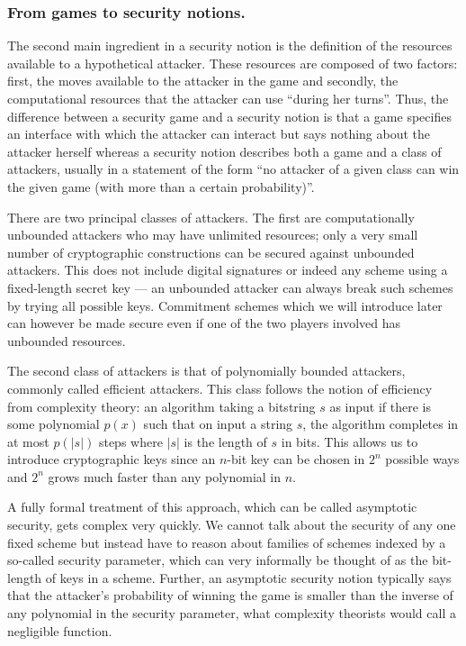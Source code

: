 \documentclass{llncs}
\begin{document}
\subsubsection{From games to security notions.}
The second main ingredient in a security notion is the definition of the
resources available to a hypothetical attacker. These resources are composed of
two factors: first, the moves available to the attacker in the game and
secondly, the computational resources that the attacker can use ``during her
turns''. Thus, the difference between a security game and a security notion is
that a game specifies an interface with which the attacker can interact but says
nothing about the attacker herself whereas a security notion describes both a
game and a class of attackers, usually in a statement of the form ``no attacker
of a given class can win the given game (with more than a certain probability)''.

There are two principal classes of attackers. The first are computationally
unbounded attackers who may have unlimited resources; only a very small number
of cryptographic constructions can be secured against unbounded attackers. This
does not include digital signatures or indeed any scheme using a fixed-length
secret key --- an unbounded attacker can always break such schemes by trying all
possible keys. Commitment schemes which we will introduce later can however be
made secure even if one of the two players involved has unbounded resources.

The second class of attackers is that of polynomially bounded attackers,
commonly called efficient attackers. This class follows the notion of efficiency
from complexity theory: an algorithm taking a bitstring $s$ as input if there is
some polynomial $p(x)$ such that on input a string $s$, the algorithm completes
in at most $p(|s|)$ steps where $|s|$ is the length of $s$ in bits. This allows
us to introduce cryptographic keys since an $n$-bit key can be chosen in $2^n$
possible ways and $2^n$ grows much faster than any polynomial in $n$.

A fully formal treatment of this approach, which can be called asymptotic
security, gets complex very quickly. We cannot talk about the security of any
one fixed scheme but instead have to reason about families of schemes indexed by
a so-called security parameter, which can very informally be thought of as the
bit-length of keys in a scheme. Further, an asymptotic security notion typically
says that the attacker's probability of winning the game is smaller than the
inverse of any polynomial in the security parameter, what complexity theorists
would call a negligible function\footnotemark.
\end{document}
